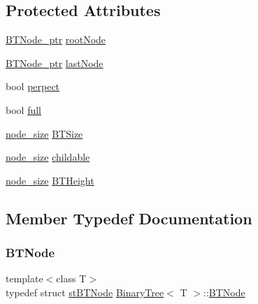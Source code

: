 \subsection*{Protected Attributes}
\begin{DoxyCompactItemize}
\item 
\hyperlink{class_binary_tree_a35ef67d8ee2843144c5c309c5a6ecd5b}{B\+T\+Node\+\_\+ptr} \hyperlink{class_binary_tree_a199fe7180a65cb3fd98939bf1389feb8}{root\+Node}
\item 
\hyperlink{class_binary_tree_a35ef67d8ee2843144c5c309c5a6ecd5b}{B\+T\+Node\+\_\+ptr} \hyperlink{class_binary_tree_a8de6e53383dad4cb80e07b361556efd5}{last\+Node}
\item 
bool \hyperlink{class_binary_tree_af98b75fa16f1b5789106784f8c385434}{perpect}
\item 
bool \hyperlink{class_binary_tree_a331f90345d6b53021945eb74a35a9d69}{full}
\item 
\hyperlink{class_binary_tree_a6c9d1d57bf13ca658fe926a0c7255ecf}{node\+\_\+size} \hyperlink{class_binary_tree_ab81143527ccb89d1d804477ab04dce4e}{B\+T\+Size}
\item 
\hyperlink{class_binary_tree_a6c9d1d57bf13ca658fe926a0c7255ecf}{node\+\_\+size} \hyperlink{class_binary_tree_a0497a11fec63475eb2d35f56bd990fc9}{childable}
\item 
\hyperlink{class_binary_tree_a6c9d1d57bf13ca658fe926a0c7255ecf}{node\+\_\+size} \hyperlink{class_binary_tree_a2917f2e27810e6ddbb91ab01d0121a78}{B\+T\+Height}
\end{DoxyCompactItemize}


\subsection{Member Typedef Documentation}
\mbox{\label{class_binary_tree_a626c02fa72521fa5977d10d8785552f7}} 
\subsubsection{\texorpdfstring{B\+T\+Node}{BTNode}}
{\footnotesize\ttfamily template$<$class T$>$ \\
typedef struct \hyperlink{struct_binary_tree_1_1st_b_t_node}{st\+B\+T\+Node} \hyperlink{class_binary_tree}{Binary\+Tree}$<$ T $>$\+::\hyperlink{class_binary_tree_a626c02fa72521fa5977d10d8785552f7}{B\+T\+Node}}

